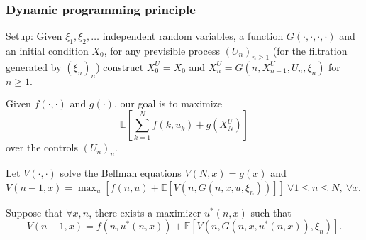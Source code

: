 \documentclass{article}
\theoremstyle{definition}
\begin{document}

\subsubsection{Dynamic programming principle}
Setup: Given $\xi_1,\xi_2,\ldots$ independent random variables, a function $G(\cdot ,\cdot ,\cdot, \cdot)$ and an initial condition $X_0$, for any previsible process $(U_n)_{n\ge 1}$ (for the filtration generated by $(\xi_n)_n$) construct $X_0^U = X_0$ and $X_n^U = G(n,X_{n-1}^U, U_n, \xi_n)$ for $n\ge 1.$
\vspace{1mm}

Given $f(\cdot ,\cdot )$ and $g(\cdot)$, our goal is to maximize \[
\mathbb{E}[\sum_{k=1}^{N} f(k,u_k)+g(X_N^U)]
\]
over the controls $(U_n)_n$.

Let $V(\cdot ,\cdot )$ solve the Bellman equations $V(N,x)=g(x)$ and $V(n-1,x) = \max_{u} \left[f(n,u) + \mathbb{E}[V(n,G(n,x,u,\xi_n))] \right] ~\forall 1\le n\le N, ~\forall x$.

Suppose that $\forall x,n$, there exists a maximizer $u^*(n,x)$ such that $$V(n-1,x)=f(n,u^*(n,x)) + \mathbb{E}[V(n,G(n,x,u^*(n,x)), \xi_n)].$$
\end{document}
